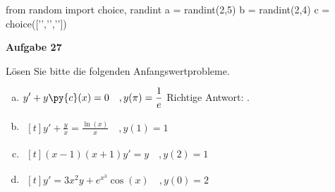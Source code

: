 \documentclass[a4paper,12pt]{article}
\newcommand{\Aufgabe}[1]{
	{
		\vspace*{0.5cm}
		\textsf{\textbf{Aufgabe #1}}
		\vspace*{0.2cm}
		
	}
}
\begin{document}
\begin{pycode}
from random import choice, randint
a = randint(2,5)
b = randint(2,4)
c = choice(['\sin','\cos','\ttan'])
\end{pycode}

\Aufgabe{27}
Lösen Sie bitte die folgenden Anfangswertprobleme.
\begin{multicols}{2}
	\begin{enumerate}[a)]
		\item $\begin{aligned}[t]
		y' + y\py{c}(x) = 0 \quad , y(\pi) = \frac{1}{e}
		\end{aligned}$ 
		\newline
		\ifnum{} 
			Richtige Antwort: .
		\fi 
		\newline
		\item $\begin{aligned}[t]
		y' + \frac{y}{x} = \frac{\ln(x)}{x} \quad  , y(1) = 1
		\end{aligned}$ 
		\item $\begin{aligned}[t]
		(x-1)(x+1)y' = y \quad  , y(2) = 1
		\end{aligned}$ 
		\item $\begin{aligned}[t]
		y' = 3x^2y + e^{x^3}\cos(x) \quad  , y(0) = 2
		\end{aligned}$ 
	\end{enumerate}
\end{multicols}
\end{document}
